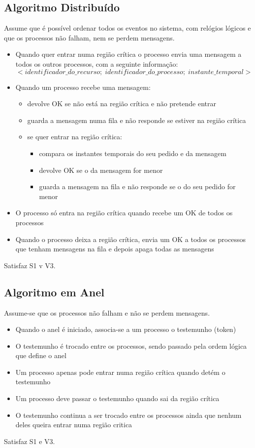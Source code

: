 \documentclass[10pt,a4paper]{report}
\begin{document}
\subsection{Algoritmo Distribuído}
Assume que é possível ordenar todos os eventos no sistema, com relógios lógicos e que os processos não falham, nem se perdem mensagens.
\begin{itemize}
\item Quando quer entrar numa região crítica o processo envia uma mensagem a todos os outros processos, com a seguinte informação:
$$
<identificador\_do\_recurso;\;identificador\_do\_processo;\;instante\_temporal>
$$
\item Quando um processo recebe uma mensagem:
\begin{itemize}
\item devolve OK se não está na região crítica e não pretende entrar
\item guarda a mensagem numa fila e não responde se estiver na região crítica
\item se quer entrar na região crítica:
\begin{itemize}
\item compara os instantes temporais do seu pedido e da mensagem
\item devolve OK se o da mensagem for menor
\item guarda a mensagem na fila e não responde se o do seu pedido for menor
\end{itemize}
\end{itemize}
\item O processo só entra na região crítica quando recebe um OK de todos os processos
\item Quando o processo deixa a região crítica, envia um OK a todos os processos que tenham mensagens na fila e depois apaga todas as mensagens
\end{itemize}
Satisfaz S1 v V3.
\subsection{Algoritmo em Anel}
Assume-se que os processos não falham e não se perdem mensagens.
\begin{itemize}
\item Quando o anel é iniciado, associa-se a um processo o testemunho (token)
\item O testemunho é trocado entre os processos, sendo passado pela ordem lógica que define o anel
\item Um processo apenas pode entrar numa região crítica quando detém o testemunho
\item Um processo deve passar o testemunho quando sai da região crítica
\item O testemunho continua a ser trocado entre os processos ainda que nenhum deles queira entrar numa região critica
\end{itemize}
Satisfaz S1 e V3.
\end{document}
